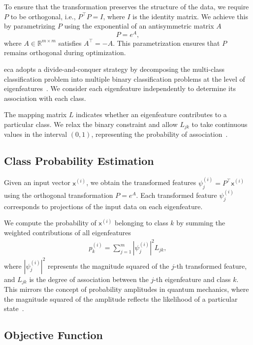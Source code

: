 \documentclass[conference]{IEEEtran}
\begin{document}
To ensure that the transformation preserves the structure of the data, we require \( P \) to be orthogonal, i.e., \( P^\top P = I \), where \( I \) is the identity matrix. We achieve this by parametrizing \( P \) using the exponential of an antisymmetric matrix \( A \)~\cite{absil2008optimization}
\begin{equation}
P = e^{A},
\end{equation}
where \( A \in \mathbb{R}^{m \times m} \) satisfies \( A^\top = -A \). This parametrization ensures that \( P \) remains orthogonal during optimization.

\Gls{eca} adopts a divide-and-conquer strategy by decomposing the multi-class classification problem into multiple binary classification problems at the level of eigenfeatures~\cite{dietterich2000ensemble}. We consider each eigenfeature independently to determine its association with each class.

The mapping matrix \( L \) indicates whether an eigenfeature contributes to a particular class. We relax the binary constraint and allow \( L_{jk} \) to take continuous values in the interval \( (0,1) \), representing the probability of association~\cite{liu2011defense}.

\subsection{Class Probability Estimation}

Given an input vector \( \mathsf{x}^{(i)} \), we obtain the transformed features \( \psi_j^{(i)} = P^\top \mathsf{x}^{(i)} \) using the orthogonal transformation \( P = e^A \). Each transformed feature \( \psi_j^{(i)} \) corresponds to projections of the input data on each eigenfeature.

We compute the probability of \( \mathsf{x}^{(i)} \) belonging to class \( k \) by summing the weighted contributions of all eigenfeatures
\begin{align}
    p_k^{(i)} = \sum_{j=1}^m |\psi_j^{(i)}|^2 L_{jk},
\end{align}
where \( |\psi_j^{(i)}|^2 \) represents the magnitude squared of the \( j \)-th transformed feature, and \( L_{jk} \) is the degree of association between the \( j \)-th eigenfeature and class \( k \). This mirrors the concept of probability amplitudes in quantum mechanics, where the magnitude squared of the amplitude reflects the likelihood of a particular state~\cite{nielsen2010quantum}.

\subsection{Objective Function}
\end{document}
